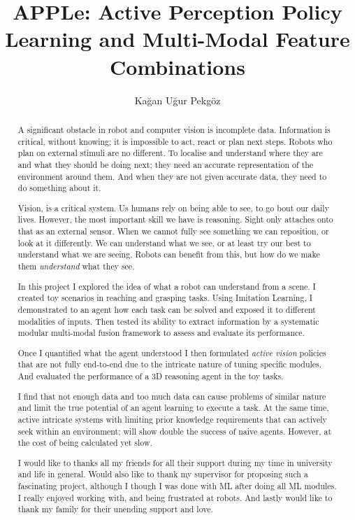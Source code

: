 \documentclass[a4paper, twoside]{report}
\title{APPLe: Active Perception Policy Learning and Multi-Modal Feature Combinations}
\author{Kağan Uğur Pekgöz}
\begin{document}


\begin{abstract}
  
  A significant obstacle in robot and computer vision is incomplete data. Information is critical, without knowing; it is impossible to act, react or plan next steps. Robots who plan on external stimuli are no different. To localise and understand where they are and what they should be doing next; they need an accurate representation of the environment around them. And when they are not given accurate data, they need to do something about it.

  Vision, is a critical system. Us humans rely on being able to see, to go bout our daily lives. However, the most important skill we have is reasoning. Sight only attaches onto that as an external sensor. When we cannot fully see something we can reposition, or look at it differently. We can understand what we see, or at least try our best to understand what we are seeing. Robots can benefit from this, but how do we make them \emph{understand} what they see.

  In this project I explored the idea of what a robot can understand from a scene. I created toy scenarios in reaching and grasping tasks. Using Imitation Learning, I demonstrated to an agent how each task can be solved and exposed it to different modalities of inputs. Then tested its ability to extract information by a systematic modular multi-modal fusion framework to assess and evaluate its performance.
  
  Once I quantified what the agent understood I then formulated \emph{active vision} policies that are not fully end-to-end due to the intricate nature of tuning specific modules. And evaluated the performance of a 3D reasoning agent in the toy tasks.
  
  I find that not enough data and too much data can cause problems of similar nature and limit the true potential of an agent learning to execute a task. At the same time, active intricate systems with limiting prior knowledge requirements that can actively seek within an environment; will show double the success of naive agents. However, at the cost of being calculated yet slow.
\end{abstract}

\renewcommand{\abstractname}{Acknowledgements}
\begin{abstract}
I would like to thanks all my friends for all their support during my time in university and life in general.
Would also like to thank my supervisor for proposing such a fascinating project, although I though I was done with ML after doing all ML modules. I really enjoyed working with, and being frustrated at robots.
And lastly would like to thank my family for their unending support and love.
\end{abstract}
\end{document}
